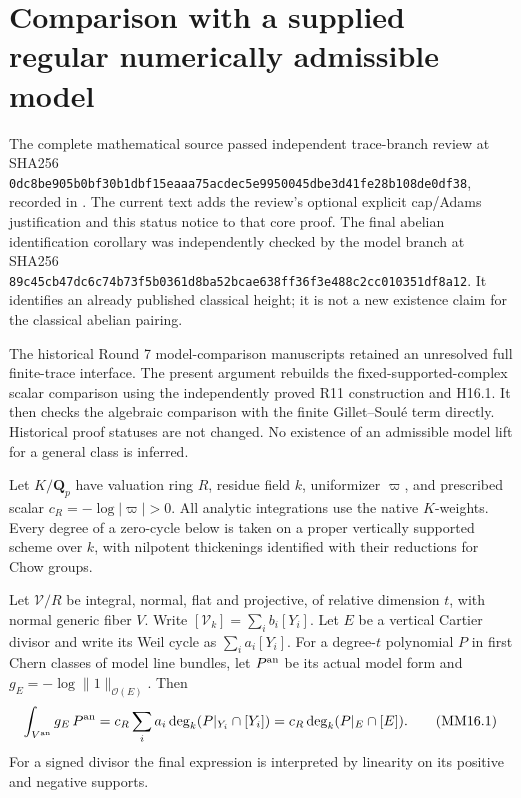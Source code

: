 \section{Comparison with a supplied regular numerically admissible model}
\label{r16mm:section}

The complete mathematical source passed independent trace-branch
review at SHA256
\texttt{0dc8be905b0bf30b1dbf15eaaa75acdec5e9950045dbe3d41fe28b108de0df38},
recorded in
.
The current text adds the review's optional explicit cap/Adams
justification and this status notice to that core proof. The final
abelian identification corollary was independently checked by the
model branch at SHA256
\texttt{89c45cb47dc6c74b73f5b0361d8ba52bcae638ff36f3e488c2cc010351df8a12}.
It identifies an already published classical height; it is not
a new existence claim for the classical abelian pairing.

The historical Round 7 model-comparison manuscripts retained an
unresolved full finite-trace interface. The present argument rebuilds
the fixed-supported-complex scalar comparison using the independently
proved R11 construction and H16.1. It then checks the algebraic
comparison with the finite Gillet--Soul\'e term directly. Historical
proof statuses are not changed. No existence of an admissible model
lift for a general class is inferred.

Let $K/\mathbf Q_p$ have valuation ring $R$, residue field $k$,
uniformizer $\varpi$, and prescribed scalar
$c_R=-\log|\varpi|>0$. All analytic integrations use the native
$K$-weights. Every degree of a zero-cycle below is taken on a
proper vertically supported scheme over $k$, with nilpotent
thickenings identified with their reductions for Chow groups.

\begin{lemma}
\label{r16mm:vertical}
Let $\mathcal V/R$ be integral, normal, flat and projective,
of relative dimension $t$, with normal generic fiber $V$.
Write $[\mathcal V_k]=\sum_i b_i[Y_i]$. Let $E$ be a vertical
Cartier divisor and write its Weil cycle as $\sum_i a_i[Y_i]$.
For a degree-$t$ polynomial $P$ in first Chern classes of model
line bundles, let $P^{\rm an}$ be its actual model form and
$g_E=-\log\|1\|_{\mathcal O(E)}$. Then
\[
 \int_{V^{\rm an}}g_E\,P^{\rm an}
     =c_R\sum_i a_i\deg_k(P|_{Y_i}\cap[Y_i])
     =c_R\deg_k(P|_E\cap[E]).
 \tag{MM16.1}\label{r16mm:vertical-eq}
\]
For a signed divisor the final expression is interpreted by
linearity on its positive and negative supports.
\end{lemma}

